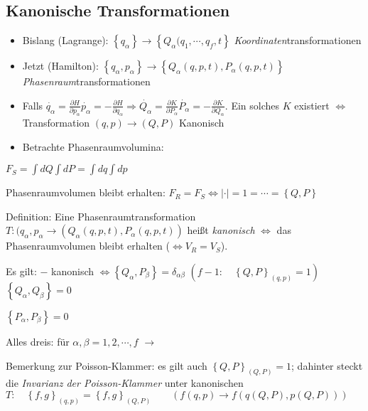 \subsection{Kanonische Transformationen}
\begin{itemize}
\item Bislang (Lagrange):
  $\left\{ q_{\alpha}\right\}\rightarrow \left\{
    Q_{\alpha}(q_1,\cdots,q_f,t \right\}$
  \emph{Koordinaten}transformationen
\item Jetzt (Hamilton):
  $\left\{ q_{\alpha}, p_{\alpha} \right\} \rightarrow \left\{
    Q_{\alpha}(q,p,t), P_{\alpha}(q,p,t) \right\}$
  \emph{Phasenraum}transformationen
\item Falls
  $\dot{q_{\alpha}} = \frac{\partial H}{\partial p_{\alpha}}
  \dot{p_{\alpha}} = -\frac{\partial H}{\partial q_{\alpha}}
  \Rightarrow \dot{Q_{\alpha}} = \frac{\partial K}{\partial
    P_{\alpha}} \dot{P_{\alpha}} = -\frac{\partial K}{\partial
    Q_{\alpha}}$.
  Ein solches $K$ existiert $\Leftrightarrow$ Transformation
  $(q,p) \rightarrow(Q,P)$ Kanonisch
\item Betrachte Phasenraumvolumina:
\end{itemize}

$
F_S = \int dQ \int dP = \int dq \int dp
$

Phasenraumvolumen bleibt erhalten: $F_R = F_S \Leftrightarrow \left| \cdot \right| = 1 = \cdots = \left\{ Q,P \right\}$

Definition: Eine Phasenraumtransformation $T: (q_{\alpha}, p_{\alpha} \rightarrow (Q_{\alpha}(q,p,t), P_{\alpha}(q,p,t))$ heißt \emph{kanonisch} $\Leftrightarrow$ das Phasenraumvolumen bleibt erhalten ($\Leftrightarrow V_R=V_S$).

Es gilt: $-$ kanonisch
$\Leftrightarrow \left\{ Q_{\alpha},P_{\beta} \right\} =
\delta_{\alpha\beta} $
$ \left( f-1:\quad \left\{ Q,P \right\}_{(q,p)} = 1 \right) $
$\left\{ Q_{\alpha}, Q_{\beta} \right\} = 0$

$\left\{ P_{\alpha}, P_{\beta} \right\} = 0$

Alles dreis: für $\alpha,\beta = 1,2,\cdots,f$
$\rightarrow$

Bemerkung zur Poisson-Klammer: es gilt auch $\left\{ Q,P \right\}_{(Q,P)} = 1$; dahinter steckt die \emph{Invarianz der Poisson-Klammer} unter kanonischen $T: \quad \left\{ f,g \right\}_{(q,p)} = \left\{ f,g \right\}_{(Q,P)} \qquad \left( f(q,p) \rightarrow f(q(Q,P), p(Q,P)) \right) $

